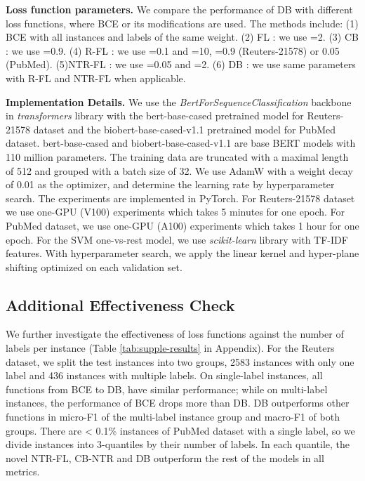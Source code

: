 \documentclass[11pt]{article}
\begin{document}
\textbf{Loss function parameters.} We compare the performance of DB with different loss functions, 
where BCE or its modifications are used.
The methods include: (1) BCE with all instances and labels of the same weight. (2) FL \citep{lin2017focal}: we use =2. (3) CB \citep{class-balanced-loss}: we use  =0.9. (4) R-FL \citep{DBLoss}: we use =0.1 and =10, =0.9 (Reuters-21578) or 0.05 (PubMed). (5)NTR-FL \citep{DBLoss}: we use =0.05 and =2. (6) DB \citep{DBLoss}: we use same parameters with R-FL and NTR-FL when applicable.

\textbf{Implementation Details.} We use the \textit{BertForSequenceClassification} backbone in \textit{transformers} library \citep{wolf-etal-2020-transformers} with the bert-base-cased pretrained model  \citep{devlin2018bert} for Reuters-21578 dataset and the biobert-base-cased-v1.1 pretrained model  \citep{10.1093/bioinformatics/btz682} for PubMed dataset. bert-base-cased and biobert-base-cased-v1.1 are base BERT models with 110 million parameters. The training data are truncated with a maximal length of 512 and grouped with a batch size of 32. We use AdamW with a weight decay of 0.01 as the optimizer, and determine the learning rate by hyperparameter search. The experiments are implemented in PyTorch. For Reuters-21578 dataset we use one-GPU (V100) experiments which takes 5 minutes for one epoch. For PubMed dataset, we use one-GPU (A100) experiments which takes 1 hour for one epoch. For the SVM one-vs-rest model, we use \textit{scikit-learn} library \citep{scikit-learn} with TF-IDF features. With hyperparameter search, we apply the linear kernel and hyper-plane shifting optimized on each validation set.

\subsection{Additional Effectiveness Check} 
We further investigate the effectiveness of loss functions against the number of labels per instance (Table \ref{tab:supple-results} in Appendix). For the Reuters dataset, we split the test instances into two groups, 2583 instances with only one label and 436 instances with multiple labels. On single-label instances, all functions from BCE to DB, have similar performance; while on multi-label instances, the performance of BCE drops more than DB. DB outperforms other functions in micro-F1 of the multi-label instance group and macro-F1 of both groups. There are < 0.1\% instances of PubMed dataset with a single label, so we divide instances into 3-quantiles by their number of labels. In each quantile, the novel NTR-FL, CB-NTR and DB outperform the rest of the models in all metrics.
\end{document}
